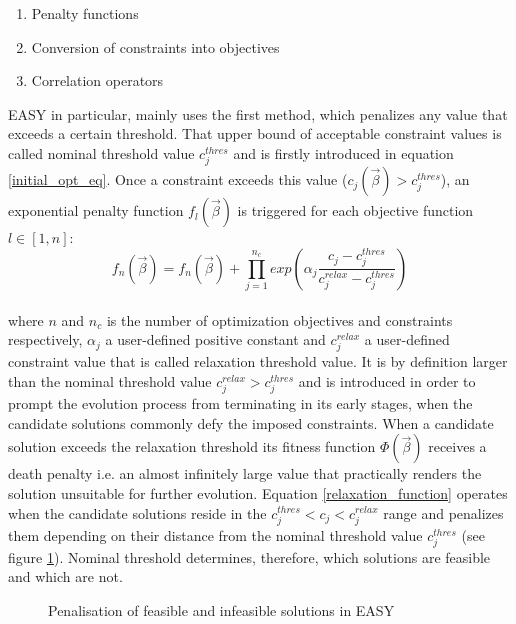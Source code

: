 \begin{enumerate}
\item Penalty functions
\item Conversion of constraints into objectives
\item Correlation operators
\end{enumerate}

EASY in particular, mainly uses the first method, 
which penalizes any value that exceeds a certain threshold. 
That upper bound of acceptable constraint values is called 
nominal threshold value $c_{j}^{thres}$ and is firstly 
introduced in equation \ref{initial_opt_eq}. Once a constraint 
exceeds this value ($ c_{j}(\vec{β}) > c_{j}^{thres}$), an 
exponential penalty function $f_{l}(\vec{β})$ is triggered for each 
objective function $l \!\in \![1,n]$:
\begin{equation}\label{relaxation_function}
f_{n}(\vec{β}) = f_{n}(\vec{β}) + \prod_{j=1}^{n_{c}} exp
\left( α_{j} \dfrac{c_{j} - c_{j}^{thres}}
{c_{j}^{relax} - c_{j}^{thres}} \right)
\end{equation} 
\\
where $n$ and $n_{c}$ is the number of optimization 
objectives and constraints respectively, $α_{j}$ a 
user-defined positive constant and $c_{j}^{relax}$ a 
user-defined constraint value that is called relaxation 
threshold value. It is by definition larger than the nominal 
threshold value $c_{j}^{relax} > c_{j}^{thres}$ and is 
introduced in order to prompt the evolution process from 
terminating in its early stages, when the candidate solutions 
commonly defy the imposed constraints. When a candidate 
solution exceeds the relaxation threshold its fitness function 
$Φ(\vec{β})$ receives a death penalty i.e. an almost infinitely 
large value that practically renders the solution unsuitable 
for further evolution. Equation \ref{relaxation_function} 
operates when the candidate solutions reside in the $c_{j}^{thres} 
\!< \! c_{j} < c_{j}^{relax}$ range and penalizes them depending on 
their distance from the nominal threshold value $c_{j}^{thres}$ 
(see figure \ref{fig:feasible_sol}). Nominal threshold determines, 
therefore, which solutions are feasible and which are not.

\begin{figure}[h!]
\centering
{}
\caption{Penalisation of feasible and infeasible 
solutions in EASY}
\label{fig:feasible_sol}
\end{figure} 

\newpage
